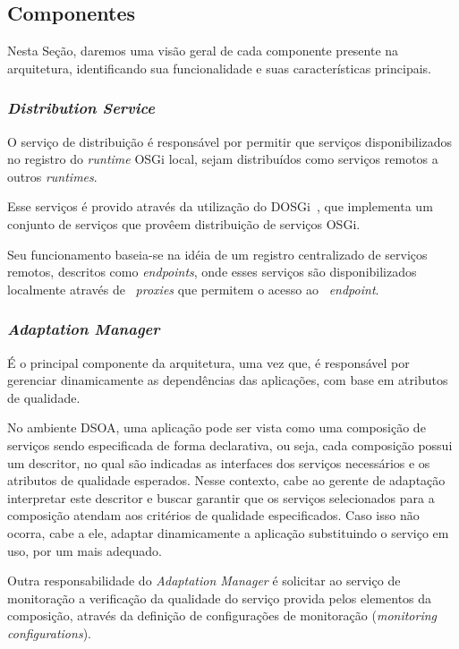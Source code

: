 \subsection{Componentes}
Nesta Seção, daremos uma visão geral de cada componente presente na arquitetura, identificando sua funcionalidade e suas características principais.

\subsubsection{\textit{Distribution Service}}
\label{subsub:dosgi}
O serviço de distribuição é responsável por permitir que serviços disponibilizados no registro do \textit{runtime} OSGi local, sejam distribuídos como serviços remotos a outros \textit{runtimes}.

Esse serviços é provido através da utilização do DOSGi~\cite{dosgi}, que implementa um conjunto de serviços que provêem distribuição de serviços OSGi. 

Seu funcionamento baseia-se na idéia de um registro centralizado de serviços remotos, descritos como \textit{endpoints}, onde esses serviços são disponibilizados localmente através de ~\textit{proxies} que permitem o acesso ao ~\textit{endpoint}.

\subsubsection{\textit{Adaptation Manager}}

É o principal componente da arquitetura, uma vez que, é responsável por gerenciar dinamicamente as dependências das aplicações, com base em atributos de qualidade. 

No ambiente DSOA, uma aplicação pode ser vista como uma composição de serviços sendo especificada de forma declarativa, ou seja, cada composição possui um descritor, no qual são indicadas as interfaces dos serviços necessários e os atributos de qualidade esperados. Nesse contexto, cabe ao gerente de adaptação interpretar este descritor e buscar garantir que os serviços selecionados para a composição atendam aos critérios de qualidade especificados. Caso isso não ocorra, cabe a ele, adaptar dinamicamente a aplicação substituindo o serviço em uso, por um mais adequado.

Outra responsabilidade do \textit{Adaptation Manager} é solicitar ao serviço de monitoração a verificação da qualidade do serviço provida pelos elementos da composição, através da definição de configurações de monitoração (\textit{monitoring configurations}).

